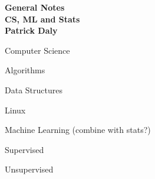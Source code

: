 \documentclass[11pt]{article}
\begin{document}
\begin{center}
  \vspace*{10mm}
  {\bf {\huge General Notes}}\\
  \vspace*{5mm}
  {\bf {CS, ML and Stats}
    \\ \vspace*{2mm} {\large Patrick Daly}
  }
\end{center}

\newpage

\begin{enumerate}

    \begin{item}

      Computer Science

      \begin{enumerate}

          \begin{item}
            Algorithms
          \end{item}

          \begin{item}
            Data Structures
          \end{item}

          \begin{item}
            Linux
          \end{item}

      \end{enumerate}

    \end{item}

    \begin{item}

      Machine Learning (combine with stats?)

      \begin{enumerate}

          \begin{item}
            Supervised
          \end{item}

          \begin{item}
            Unsupervised
          \end{item}

      \end{enumerate}

    \end{item}

    \begin{item}


\end{item}
\end{enumerate}
\end{document}
